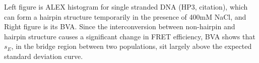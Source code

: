 Left figure is ALEX histogram for single stranded DNA (HP3, citation), which can form a hairpin structure temporarily in the presence of 400mM NaCl, and Right figure is its BVA. Since the interconversion between non-hairpin and hairpin structure causes a significant change in FRET efficiency, BVA shows that $s_E$, in the bridge region between two populations, sit largely above the expected standard deviation curve.